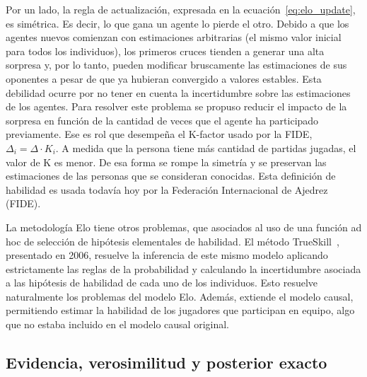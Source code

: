 \documentclass[a4paper,11pt]{book}
\theoremstyle{definition}
\begin{document}

Por un lado, la regla de actualizaci\'on, expresada en la ecuaci\'on~\eqref{eq:elo_update}, es sim\'etrica. 
Es decir, lo que gana un agente lo pierde el otro.
%
Debido a que los agentes nuevos comienzan con estimaciones arbitrarias (el mismo valor inicial para todos los individuos), los primeros cruces tienden a generar una alta sorpresa y, por lo tanto, pueden modificar bruscamente las estimaciones de sus oponentes a pesar de que ya hubieran convergido a valores estables.
%
Esta debilidad ocurre por no tener en cuenta la incertidumbre sobre las estimaciones de los agentes.
%
Para resolver este problema se propuso reducir el impacto de la sorpresa en funci\'on de la cantidad de veces que el agente ha participado previamente.
%
Ese es rol que desempe\~na el K-factor usado por la FIDE, $\Delta_i = \Delta \cdot K_i$.
%
A medida que la persona tiene m\'as cantidad de partidas jugadas, el valor de K es menor.
%
De esa forma se rompe la simetr\'ia y se preservan las estimaciones de las personas que se consideran conocidas.
%
Esta definici\'on de habilidad es usada todav\'ia hoy por la Federaci\'on Internacional de Ajedrez (FIDE).


La metodolog\'ia Elo tiene otros problemas, que asociados al uso de una funci\'on ad hoc de selecci\'on de hip\'otesis elementales de habilidad.
%
El m\'etodo TrueSkill~\cite{Herbrich2007,trueskill_patent_06, trueskill_patent_09}, presentado en 2006, resuelve la inferencia de este mismo modelo aplicando estrictamente las reglas de la probabilidad y calculando la incertidumbre asociada a las hip\'otesis de habilidad de cada uno de los individuos.
%
Esto resuelve naturalmente los problemas del modelo Elo.
%
Adem\'as, extiende el modelo causal, permitiendo estimar la habilidad de los jugadores que participan en equipo, algo que no estaba incluido en el modelo causal original.

\subsection{Evidencia, verosimilitud y posterior exacto} \label{sec:trueskill}
\end{document}
